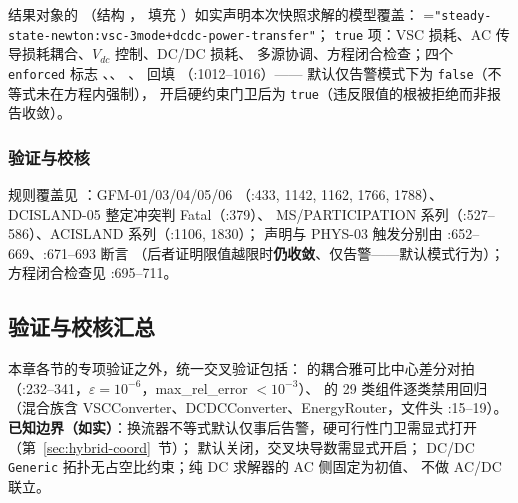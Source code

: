结果对象的 （结构
，
填充 ）如实声明本次快照求解的模型覆盖：
=\texttt{"steady-state-newton:vsc-3mode+dcdc-power-transfer"}；
\texttt{true} 项：VSC 损耗、AC 传导损耗耦合、$V_{dc}$ 控制、DC/DC 损耗、
多源协调、方程闭合检查；四个 \texttt{enforced} 标志
、、
、
回填 （:1012--1016）——
默认仅告警模式下为 \texttt{false}（不等式未在方程内强制），
开启硬约束门卫后为 \texttt{true}（违反限值的根被拒绝而非报告收敛）。

\subsubsection*{验证与校核}
规则覆盖见 ：GFM-01/03/04/05/06
（:433, 1142, 1162, 1766, 1788）、DCISLAND-05 整定冲突判 Fatal（:379）、
MS/PARTICIPATION 系列（:527--586）、ACISLAND 系列（:1106, 1830）；
 声明与 PHYS-03 触发分别由 :652--669、:671--693 断言
（后者证明限值越限时\textbf{仍收敛}、仅告警——默认模式行为）；方程闭合检查见 :695--711。

\subsection{验证与校核汇总}
本章各节的专项验证之外，统一交叉验证包括：
的耦合雅可比中心差分对拍（:232--341，$\varepsilon=10^{-6}$，max\_rel\_error $<10^{-3}$）、
 的 29 类组件逐类禁用回归
（混合族含 VSCConverter、DCDCConverter、EnergyRouter，文件头 :15--19）。
\textbf{已知边界（如实）}：换流器不等式默认仅事后告警，硬可行性门卫需显式打开
（第~\ref{sec:hybrid-coord}~节）；
 默认关闭，交叉块导数需显式开启；
DC/DC \texttt{Generic} 拓扑无占空比约束；纯 DC 求解器的 AC 侧固定为初值、
不做 AC/DC 联立。
